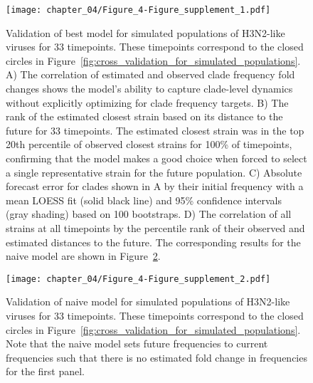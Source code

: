 \begin{figure}
  \texttt{[image: chapter\_04/Figure\_4-Figure\_supplement\_1.pdf]}
  \caption{
    Validation of best model for simulated populations of H3N2-like viruses for 33 timepoints.
    These timepoints correspond to the closed circles in Figure~\ref{fig:cross_validation_for_simulated_populations}.
    A) The correlation of estimated and observed clade frequency fold changes shows the model's ability to capture clade-level dynamics without explicitly optimizing for clade frequency targets.
    B) The rank of the estimated closest strain based on its distance to the future for 33 timepoints.
    The estimated closest strain was in the top 20th percentile of observed closest strains for 100\% of timepoints, confirming that the model makes a good choice when forced to select a single representative strain for the future population.
    C) Absolute forecast error for clades shown in A by their initial frequency with a mean LOESS fit (solid black line) and 95\% confidence intervals (gray shading) based on 100 bootstraps.
    D) The correlation of all strains at all timepoints by the percentile rank of their observed and estimated distances to the future.
    The corresponding results for the naive model are shown in Figure~\ref{fig:validation_of_naive_model_for_simulated_populations}.
  }
  \label{fig:validation_of_best_model_for_simulated_populations}
\end{figure}

\begin{figure}
  \texttt{[image: chapter\_04/Figure\_4-Figure\_supplement\_2.pdf]}
  \caption{
    Validation of naive model for simulated populations of H3N2-like viruses for 33 timepoints.
    These timepoints correspond to the closed circles in Figure~\ref{fig:cross_validation_for_simulated_populations}.
    Note that the naive model sets future frequencies to current frequencies such that there is no estimated fold change in frequencies for the first panel.
  }
  \label{fig:validation_of_naive_model_for_simulated_populations}
\end{figure}

